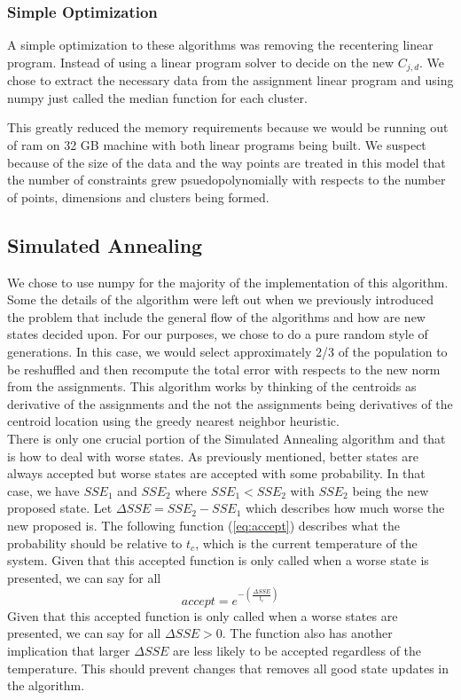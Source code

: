 \documentclass[a4paper,12pt]{article}
\numberwithin{equation}{section}
\begin{document}
\subsubsection{Simple Optimization}
A simple optimization to these algorithms was removing the recentering linear program. Instead of using a linear program solver to decide on the new  $C_{j,d}$. We chose to extract the necessary data from the assignment linear program and using numpy just called the median function for each cluster. 

This greatly reduced the memory requirements because we would be running out of ram on 32 GB machine with both linear programs being built. We suspect because of the size of the data and the way points are treated in this model that the number of constraints grew psuedopolynomially with respects to the number of points, dimensions and clusters being formed. 

\subsection{Simulated Annealing}\label{sec: sa_imp}
We chose to use numpy for the majority of the implementation of this algorithm.  Some the details of the algorithm were left out when we previously introduced the problem that include the general flow of the algorithms and how are new states decided upon. For our purposes, we chose to do a pure random style of generations. In this case, we would select approximately 2/3 of the population to be reshuffled and then recompute the total error with respects to the new norm from the assignments. This algorithm works by thinking of the centroids as derivative of the assignments and the not the assignments being derivatives of the centroid location using the greedy nearest neighbor heuristic. \\

There is only one crucial portion of the Simulated Annealing algorithm and that is how to deal with worse states. As previously mentioned, better states are always accepted but worse states are accepted with some probability. In that case, we have $SSE_1$ and $SSE_2$ where $SSE_1 < SSE_2$ with $SSE_2$ being the new proposed state. Let $\Delta SSE = SSE_2 - SSE_1$ which describes how much worse the new proposed is. The following function (\ref{eq:accept}) describes what the probability should be relative to $t_c$, which is the current temperature of the system.  Given that this accepted function is only called when a worse state is presented, we can say for all 
\begin{equation} \label{eq:accept}
 	accept=e^{-\left(\frac{\Delta SSE}{t_c}\right)}
\end{equation}
Given that this accepted function is only called when a worse states are presented, we can say for all $\Delta SSE>0$.  The function also has another implication that larger $\Delta SSE$ are less likely to be accepted regardless of the temperature. This should prevent changes that removes all good state updates in the algorithm. \\
\end{document}
